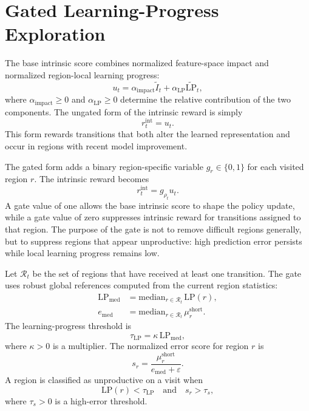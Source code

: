 \section{Gated Learning-Progress Exploration}
\label{sec:gated_learning_progress_exploration}

The base intrinsic score combines normalized feature-space impact and normalized region-local learning progress:
\begin{equation}
    u_t
    = \alpha_{\mathrm{impact}}\widetilde{I}_t
    + \alpha_{\mathrm{LP}}\widetilde{\mathrm{LP}}_t,
    \label{eq:base_intrinsic_score}
\end{equation}
where $\alpha_{\mathrm{impact}}\ge 0$ and $\alpha_{\mathrm{LP}}\ge 0$ determine the relative contribution of the two components.
The ungated form of the intrinsic reward is simply
\begin{equation}
    r_t^{\mathrm{int}}=u_t.
\end{equation}
This form rewards transitions that both alter the learned representation and occur in regions with recent model improvement.

The gated form adds a binary region-specific variable $g_r\in\{0,1\}$ for each visited region $r$.
The intrinsic reward becomes
\begin{equation}
    r_t^{\mathrm{int}}=g_{\rho_t}u_t.
    \label{eq:gated_intrinsic_reward}
\end{equation}
A gate value of one allows the base intrinsic score to shape the policy update, while a gate value of zero suppresses intrinsic reward for transitions assigned to that region.
The purpose of the gate is not to remove difficult regions generally, but to suppress regions that appear unproductive: high prediction error persists while local learning progress remains low.

Let $\mathcal{R}_t$ be the set of regions that have received at least one transition.
The gate uses robust global references computed from the current region statistics:
\begin{align}
    \mathrm{LP}_{\mathrm{med}}
    &= \mathrm{median}_{r\in\mathcal{R}_t}\,\mathrm{LP}(r), \\
    e_{\mathrm{med}}
    &= \mathrm{median}_{r\in\mathcal{R}_t}\,\mu_r^{\mathrm{short}}.
\end{align}
The learning-progress threshold is
\begin{equation}
    \tau_{\mathrm{LP}}=\kappa\,\mathrm{LP}_{\mathrm{med}},
\end{equation}
where $\kappa>0$ is a multiplier.
The normalized error score for region $r$ is
\begin{equation}
    s_r=\frac{\mu_r^{\mathrm{short}}}{e_{\mathrm{med}}+\varepsilon}.
\end{equation}
A region is classified as unproductive on a visit when
\begin{equation}
    \mathrm{LP}(r)<\tau_{\mathrm{LP}}
    \quad\text{and}\quad
    s_r>\tau_s,
    \label{eq:unproductive_region_condition}
\end{equation}
where $\tau_s>0$ is a high-error threshold.

